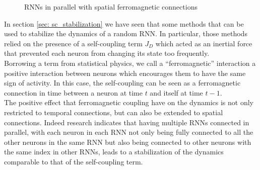 \documentclass[a4paper,12pt]{report}
\begin{document}
\begin{figure}[h!] %
    \centering
    \caption{RNNs in parallel with spatial ferromagnetic connections}
    \label{fig:diagram_spatial_ferromagnetic}
\end{figure}

In section \ref{sec: sc_stabilization} we have seen that some methods that can be used to stabilize the 
dynamics of a random RNN. In particular, those methods relied on the presence of a self-coupling term
$J_D$ which acted as an inertial force that prevented each neuron from changing its state too 
frequently. \\
Borrowing a term from statistical physics, we call a ``ferromagnetic'' interaction a positive 
interaction between neurons which encourages them to have the same sign of activity. 
In this case, the self-coupling can be seen as a ferromagnetic connection in time between a neuron at 
time $t$ and itself at time $t-1$. \\
The positive effect that ferromagnetic coupling have on the dynamics is 
not only restricted to temporal connections, but can also be extended to spatial 
connections. Indeed research indicates that having multiple RNNs connected in 
parallel, with each neuron in each RNN not only being fully connected to all the 
other neurons in the same RNN but also being connected to other neurons with the same 
index in other RNNs, leads to a stabilization of the dynamics comparable to that of 
the self-coupling term.
\end{document}

